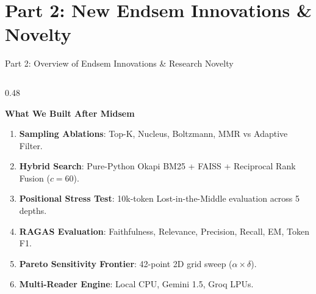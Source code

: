 \documentclass[10pt,aspectratio=169]{beamer}
\begin{document}
\section{Part 2: New Endsem Innovations \& Novelty}

\begin{frame}{Part 2: Overview of Endsem Innovations \& Research Novelty}
    \begin{columns}[onlytextwidth,T]
        \begin{column}{0.48\textwidth}
            \begin{block}{\textbf{What We Built After Midsem}}
                \footnotesize
                \begin{enumerate}\setlength\itemsep{1.5pt}
                    \item \textbf{Sampling Ablations}: Top-K, Nucleus, Boltzmann, MMR vs Adaptive Filter.
                    \item \textbf{Hybrid Search}: Pure-Python Okapi BM25 + FAISS + Reciprocal Rank Fusion ($c=60$).
                    \item \textbf{Positional Stress Test}: 10k-token Lost-in-the-Middle evaluation across 5 depths.
                    \item \textbf{RAGAS Evaluation}: Faithfulness, Relevance, Precision, Recall, EM, Token F1.
                    \item \textbf{Pareto Sensitivity Frontier}: 42-point 2D grid sweep ($\alpha \times \delta$).
                    \item \textbf{Multi-Reader Engine}: Local CPU, Gemini 1.5, Groq LPUs.
                \end{enumerate}
            \end{block}
        \end{column}
        

\end{columns}
\end{frame}
\end{document}
